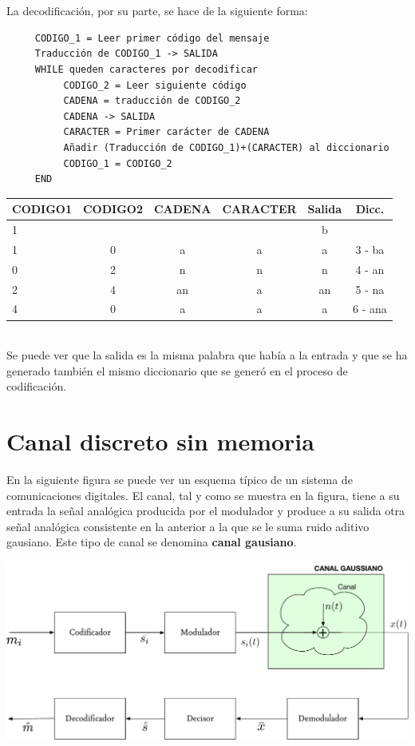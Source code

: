 \documentclass[es,apuntes]{uah}
\begin{document}
\ \\
\ \\

La decodificación, por su parte, se hace de la siguiente forma:

\begin{verbatim}
     CODIGO_1 = Leer primer código del mensaje
     Traducción de CODIGO_1 -> SALIDA
     WHILE queden caracteres por decodificar
          CODIGO_2 = Leer siguiente código
          CADENA = traducción de CODIGO_2
          CADENA -> SALIDA
          CARACTER = Primer carácter de CADENA
          Añadir (Traducción de CODIGO_1)+(CARACTER) al diccionario
          CODIGO_1 = CODIGO_2
     END
\end{verbatim}


\begin{tabular}{lccccc}
CODIGO1 & CODIGO2  & CADENA & CARACTER & Salida & Dicc.\\
\hline
1 &   &   &   & b &\\
1 & 0 & a & a & a & 3 - ba \\
0 & 2 & n & n & n & 4 - an \\
2 & 4 & an & a & an & 5 - na \\
4 & 0 & a & a & a & 6 - ana \\
\end{tabular}

\ \\
Se puede ver que la salida es la misma palabra que había a la entrada y que se ha generado también el mismo diccionario que se generó en el proceso de codificación. 



\section{Canal discreto sin memoria}

En la siguiente figura se puede ver un esquema típico de un sistema de comunicaciones digitales. El canal, tal y como se muestra en la figura, tiene a su entrada la señal analógica producida por el modulador y produce a su salida otra señal analógica consistente en la anterior a la que se le suma ruido aditivo gausiano. Este tipo de canal se denomina {\bf canal gausiano}. 

\begin{center}\includegraphics[width=14cm]{../Transparencias/Figuras/Sistema2.pdf}\end{center}
\end{document}
